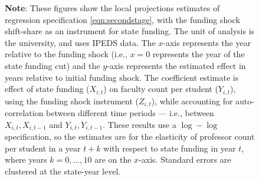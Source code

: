 \begin{figure}[H]
\begin{subfigure}[b]{0.495\textwidth}
        \label{fig:all-count-lp}
    \end{subfigure}
    \label{fig:count-lp}
    \justify
    \footnotesize
    \textbf{Note}:
    These figures show the local projections estimates of regression specification \eqref{eqn:secondstage}, with the funding shock shift-share as an instrument for state funding.
    The unit of analysis is the university, and uses IPEDS data.
    The $x$-axis represents the year relative to the funding shock (i.e., $x = 0$ represents the year of the state funding cut) and the $y$-axis represents the estimated effect in years relative to initial funding shock.
    The coefficient estimate is effect of state funding ($X_{i,t}$) on faculty count per student ($Y_{i,t}$), using the funding shock instrument ($Z_{i,t}$), while accounting for auto-correlation between different time periods --- i.e., between $X_{i,t}, X_{i,t-1}$ and $Y_{i,t}, Y_{i,t-1}$.
    These results use a $\log-\log$ specification, so the estimates are for the elasticity of professor count per student in a year $t+k$ with respect to state funding in year $t$, where years $k = 0, \hdots, 10$ are on the $x$-axis. 
    Standard errors are clustered at the state-year level.
\end{figure}


